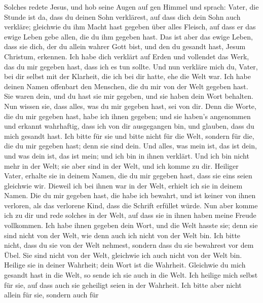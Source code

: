  Solches redete Jesus, und hob seine Augen auf gen Himmel
und sprach: Vater, die Stunde ist da, dass du deinen Sohn verklärest,
auf dass dich dein Sohn auch verkläre;  gleichwie du ihm
Macht hast gegeben über alles Fleisch, auf dass er das ewige Leben gebe
allen, die du ihm gegeben hast.  Das ist aber das ewige
Leben, dass sie dich, der du allein wahrer Gott bist, und den du gesandt
hast, Jesum Christum, erkennen.  Ich habe dich verklärt
auf Erden und vollendet das Werk, das du mir gegeben hast, dass ich es
tun sollte.  Und nun verkläre mich du, Vater, bei dir
selbst mit der Klarheit, die ich bei dir hatte, ehe die Welt war.
 Ich habe deinen Namen offenbart den Menschen, die du mir
von der Welt gegeben hast. Sie waren dein, und du hast sie mir gegeben,
und sie haben dein Wort behalten.  Nun wissen sie, dass
alles, was du mir gegeben hast, sei von dir.  Denn die
Worte, die du mir gegeben hast, habe ich ihnen gegeben; und sie haben's
angenommen und erkannt wahrhaftig, dass ich von dir ausgegangen bin, und
glauben, dass du mich gesandt hast.  Ich bitte für sie und
bitte nicht für die Welt, sondern für die, die du mir gegeben hast; denn
sie sind dein.  Und alles, was mein ist, das ist dein,
und was dein ist, das ist mein; und ich bin in ihnen verklärt.
 Und ich bin nicht mehr in der Welt; sie aber sind in der
Welt, und ich komme zu dir. Heiliger Vater, erhalte sie in deinem Namen,
die du mir gegeben hast, dass sie eins seien gleichwie wir.
 Dieweil ich bei ihnen war in der Welt, erhielt ich sie
in deinem Namen. Die du mir gegeben hast, die habe ich bewahrt, und ist
keiner von ihnen verloren, als das verlorene Kind, dass die Schrift
erfüllet würde.  Nun aber komme ich zu dir und rede
solches in der Welt, auf dass sie in ihnen haben meine Freude
vollkommen.  Ich habe ihnen gegeben dein Wort, und die
Welt hasste sie; denn sie sind nicht von der Welt, wie denn auch ich
nicht von der Welt bin.  Ich bitte nicht, dass du sie von
der Welt nehmest, sondern dass du sie bewahrest vor dem Übel.
 Sie sind nicht von der Welt, gleichwie ich auch nicht
von der Welt bin.  Heilige sie in deiner Wahrheit; dein
Wort ist die Wahrheit.  Gleichwie du mich gesandt hast in
die Welt, so sende ich sie auch in die Welt.  Ich heilige
mich selbst für sie, auf dass auch sie geheiligt seien in der Wahrheit.
 Ich bitte aber nicht allein für sie, sondern auch für
